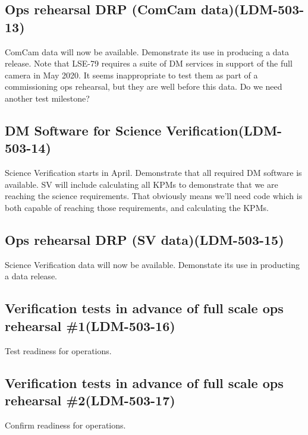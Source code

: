 \subsection{ Ops rehearsal DRP (ComCam data)\textbf{(LDM-503-13)}\label{LDM-503-13}}
 ComCam data will now be available. Demonstrate its use in producing a data release.
 \newline Note that LSE-79 requires a suite of DM services in support of the full camera in May 2020. It seems inappropriate to test them as part of a commissioning ops rehearsal, but they are well before this data. Do we need another test milestone?
\subsection{ DM Software for Science Verification\textbf{(LDM-503-14)}\label{LDM-503-14}}
 Science Verification starts in April. Demonstrate that all required DM software is available.
 \newline SV will include calculating all KPMs to demonstrate that we are reaching the science requirements. That obviously means we'll need code which is both capable of reaching those requirements, and calculating the KPMs. 
\subsection{ Ops rehearsal DRP (SV data)\textbf{(LDM-503-15)}\label{LDM-503-15}}
 Science Verification data will now be available. Demonstate its use in producting a data release.
 \newline
\subsection{Verification tests in advance of full scale ops rehearsal \#1\textbf{(LDM-503-16)}\label{LDM-503-16}}
 Test readiness for operations.
 \newline
\subsection{Verification tests in advance of full scale ops rehearsal \#2\textbf{(LDM-503-17)}\label{LDM-503-17}}
 Confirm readiness for operations.
 \newline
